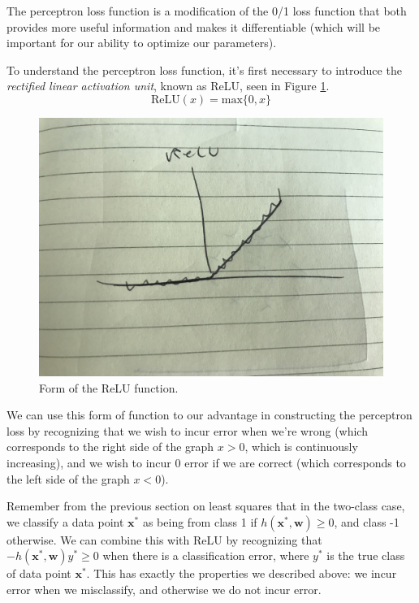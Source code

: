 The perceptron loss function is a modification of the 0/1 loss function that both provides more useful information and makes it differentiable (which will be important for our ability to optimize our parameters).

To understand the perceptron loss function, it's first necessary to introduce the \textit{rectified linear activation unit}, known as ReLU, seen in Figure \ref{fig:relu-fn}.
\begin{equation}
	\text{ReLU}(x) = \text{max}\{0, x\}
\end{equation}

\begin{figure}
    \centering
    \includegraphics[width=0.5\paperwidth]{../Classification/fig/relu_fn.jpg}
    \caption{Form of the ReLU function.}
    \label{fig:relu-fn}
\end{figure}

We can use this form of function to our advantage in constructing the perceptron loss by recognizing that we wish to incur error when we're wrong (which corresponds to the right side of the graph $x > 0$, which is continuously increasing), and we wish to incur 0 error if we are correct (which corresponds to the left side of the graph $x < 0$).

Remember from the previous section on least squares that in the two-class case, we classify a data point $\textbf{x}^{*}$ as being from class 1 if $h(\textbf{x}^{*}, \textbf{w}) \geq 0$, and class -1 otherwise. We can combine this with ReLU by recognizing that $-h(\textbf{x}^{*}, \textbf{w})y^{*} \geq 0$ when there is a classification error, where $y^{*}$ is the true class of data point $\textbf{x}^{*}$. This has exactly the properties we described above: we incur error when we misclassify, and otherwise we do not incur error.

